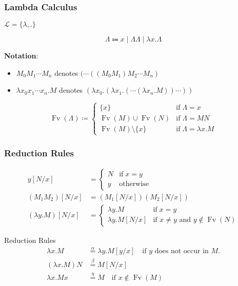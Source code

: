 \documentclass[UTF8,aspectratio=43,11pt,colorlinks,compress,openany]{beamer}%
\begin{document}
\begin{frame}\frametitle{Lambda Calculus}
	$\mathscr{L}=\{\lambda,.\}$
\setlength\abovedisplayskip{0pt}
\setlength\belowdisplayskip{0pt}
	\begin{definition}
		\[
		\Lambda\Coloneqq x\mid \Lambda\Lambda\mid \lambda x.\Lambda
		\]
	\end{definition}
	\textbf{Notation}:
	\begin{itemize}
		\item $M_0M_1\cdots M_n$ denotes $(\cdots((M_0M_1)M_2\cdots M_n)$
		\item $\lambda x_0x_1\cdots x_n.M$ denotes $(\lambda x_0.(\lambda x_1.(\cdots(\lambda x_n.M))\cdots))$
	\end{itemize}
\setlength\abovedisplayskip{0pt}
\setlength\belowdisplayskip{0pt}
	\begin{definition}
		\[
		\operatorname{Fv}(\Lambda)\coloneqq 
		\begin{cases}
		\{x\} &\text{if}\;\Lambda=x\\
		\operatorname{Fv}(M)\cup \operatorname{Fv}(N) &\text{if}\;\Lambda=MN\\
		\operatorname{Fv}(M)\setminus\{x\} &\text{if}\;\Lambda=\lambda x.M
		\end{cases}
		\]
	\end{definition}
\end{frame}

\begin{frame}\frametitle{Reduction Rules}
\setlength\abovedisplayskip{0pt}
\setlength\belowdisplayskip{0pt}
	\begin{definition}[Substitution]
		\begin{align*}
		y[N/x]&=
		\begin{cases}
		N &\text{if}\; x=y\\
		y &\text{otherwise}
		\end{cases}\\
		(M_1M_2)[N/x]&=\left(M_1[N/x]\right)\left(M_2[N/x]\right)\\
		(\lambda y.M)[N/x]&=
		\begin{cases}
		\lambda y.M &\text{if}\; x=y\\
		\lambda y.M[N/x] &\mbox{if $x\neq y$ and $y\notin \operatorname{Fv}(N)$}
		\end{cases}
		\end{align*}
	\end{definition}
\setlength\abovedisplayskip{0pt}
\setlength\belowdisplayskip{0pt}
	\begin{block}{Reduction Rules}
		\begin{align*}
		\lambda x.M&\stackrel{\alpha}{=}\lambda y.M[y/x] \quad\text{if $y$ does not occur in $M$.}\\
		(\lambda x.M)N&\stackrel{\beta}{=}M[N/x]\\
		\lambda x.Mx&\stackrel{\eta}{=}M \quad\text{if $x\notin \operatorname{Fv}(M)$}
		\end{align*}
	\end{block}
\end{frame}
\end{document}
